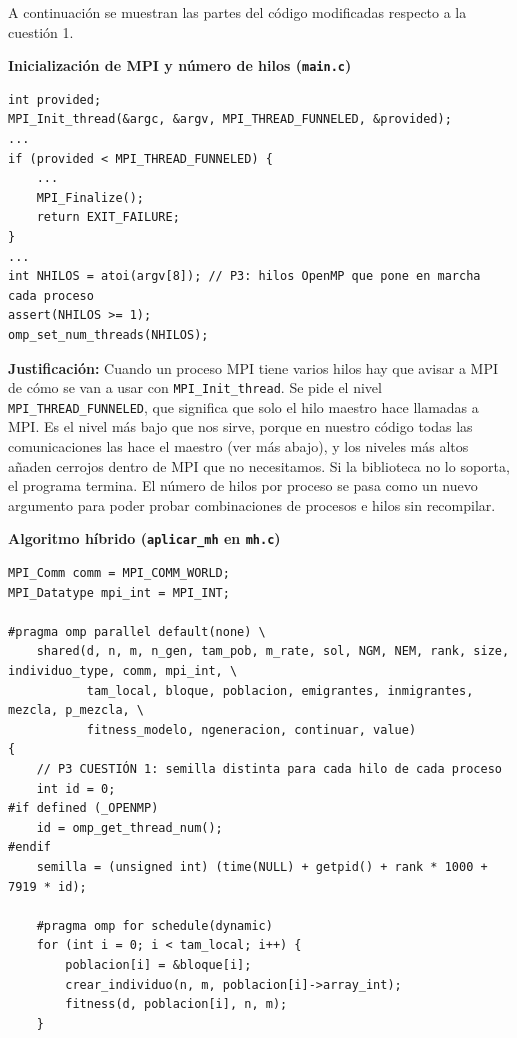 \documentclass[12pt]{article}
\begin{document}
\begin{enumerate}
A continuación se muestran las partes del código modificadas respecto a la cuestión 1.


\medskip
\noindent\textbf{Inicialización de MPI y número de hilos (\texttt{main.c})}\par
\smallskip

\begin{lstlisting}[style=EstiloC]
int provided;
MPI_Init_thread(&argc, &argv, MPI_THREAD_FUNNELED, &provided);
...
if (provided < MPI_THREAD_FUNNELED) {
	...
	MPI_Finalize();
	return EXIT_FAILURE;
}
...
int NHILOS = atoi(argv[8]); // P3: hilos OpenMP que pone en marcha cada proceso
assert(NHILOS >= 1);
omp_set_num_threads(NHILOS);
\end{lstlisting}

\textbf{Justificación:} Cuando un proceso MPI tiene varios hilos hay que avisar a MPI de cómo se van a usar con \texttt{MPI\_Init\_thread}. Se pide el nivel \texttt{MPI\_THREAD\_FUNNELED}, que significa que solo el hilo maestro hace llamadas a MPI. Es el nivel más bajo que nos sirve, porque en nuestro código todas las comunicaciones las hace el maestro (ver más abajo), y los niveles más altos añaden cerrojos dentro de MPI que no necesitamos. Si la biblioteca no lo soporta, el programa termina. El número de hilos por proceso se pasa como un nuevo argumento para poder probar combinaciones de procesos e hilos sin recompilar.

\vspace{0.5cm}


\medskip
\noindent\textbf{Algoritmo híbrido (\texttt{aplicar\_mh} en \texttt{mh.c})}\par
\smallskip

\begin{lstlisting}[style=EstiloC]
MPI_Comm comm = MPI_COMM_WORLD;
MPI_Datatype mpi_int = MPI_INT;

#pragma omp parallel default(none) \
	shared(d, n, m, n_gen, tam_pob, m_rate, sol, NGM, NEM, rank, size, individuo_type, comm, mpi_int, \
	       tam_local, bloque, poblacion, emigrantes, inmigrantes, mezcla, p_mezcla, \
	       fitness_modelo, ngeneracion, continuar, value)
{
	// P3 CUESTIÓN 1: semilla distinta para cada hilo de cada proceso
	int id = 0;
#if defined (_OPENMP)
	id = omp_get_thread_num();
#endif
	semilla = (unsigned int) (time(NULL) + getpid() + rank * 1000 + 7919 * id);

	#pragma omp for schedule(dynamic)
	for (int i = 0; i < tam_local; i++) {
		poblacion[i] = &bloque[i];
		crear_individuo(n, m, poblacion[i]->array_int);
		fitness(d, poblacion[i], n, m);
	}


\end{lstlisting}
\end{enumerate}
\end{document}
